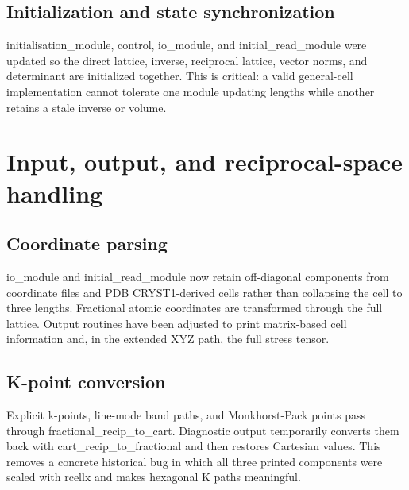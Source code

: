 \documentclass[10pt,a4paper]{report}
\begin{document}
\section{Initialization and state synchronization}
initialisation\_module, control, io\_module, and initial\_read\_module were updated so the direct lattice, inverse, reciprocal lattice, vector norms, and determinant are initialized together. This is critical: a valid general-cell implementation cannot tolerate one module updating lengths while another retains a stale inverse or volume.

\begin{center}\end{center}
\chapter{Input, output, and reciprocal-space handling}
\section{Coordinate parsing}
io\_module and initial\_read\_module now retain off-diagonal components from coordinate files and PDB CRYST1-derived cells rather than collapsing the cell to three lengths. Fractional atomic coordinates are transformed through the full lattice. Output routines have been adjusted to print matrix-based cell information and, in the extended XYZ path, the full stress tensor.

\section{K-point conversion}
Explicit k-points, line-mode band paths, and Monkhorst-Pack points pass through fractional\_recip\_to\_cart. Diagnostic output temporarily converts them back with cart\_recip\_to\_fractional and then restores Cartesian values. This removes a concrete historical bug in which all three printed components were scaled with rcellx and makes hexagonal K paths meaningful.
\end{document}
